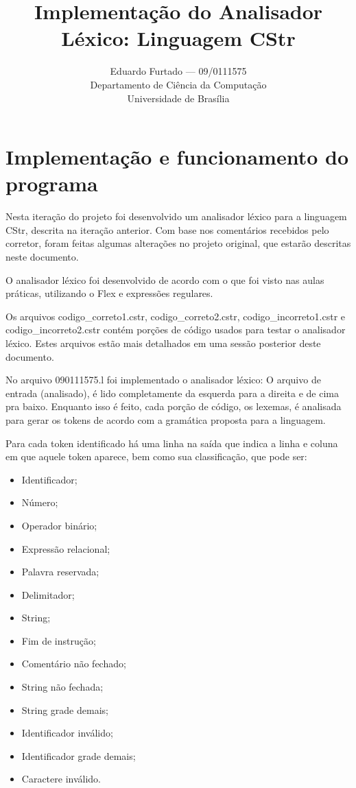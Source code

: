 \documentclass[12pt]{article}
\title{Implementação do Analisador Léxico: Linguagem CStr}
\author{Eduardo Furtado --- 09/0111575\\Departamento de Ciência da Computação\\Universidade de Brasília}
\begin{document}
\maketitle

\section{Implementação e funcionamento do programa}

\indent
Nesta iteração do projeto foi desenvolvido um analisador léxico para a linguagem CStr, descrita na iteração anterior. Com base nos comentários recebidos pelo corretor, foram feitas algumas alterações no projeto original, que estarão descritas neste documento.

O analisador léxico foi desenvolvido de acordo com o que foi visto nas aulas práticas, utilizando o Flex e expressões regulares.

Os arquivos codigo\_correto1.cstr, codigo\_correto2.cstr, codigo\_incorreto1.cstr e codigo\_incorreto2.cstr contém porções de código usados para testar o analisador léxico. Estes arquivos estão mais detalhados em uma sessão posterior deste documento.

No arquivo 090111575.l foi implementado o analisador léxico:
O arquivo de entrada (analisado), é lido completamente da esquerda para a direita e de cima pra baixo. Enquanto isso é feito, cada porção de código, os lexemas, é analisada para gerar os tokens de acordo com a gramática proposta para a linguagem.

Para cada token identificado há uma linha na saída que indica a linha e coluna em que aquele token aparece, bem como sua classificação, que pode ser:
\begin{itemize}
	\item Identificador;
	\item Número;
	\item Operador binário;
	\item Expressão relacional;
	\item Palavra reservada;
	\item Delimitador;
	\item String;
	\item Fim de instrução;
	\item Comentário não fechado;
	\item String não fechada;
	\item String grade demais;
	\item Identificador inválido;
	\item Identificador grade demais;
	\item Caractere inválido.\\
\end{itemize}
\end{document}
